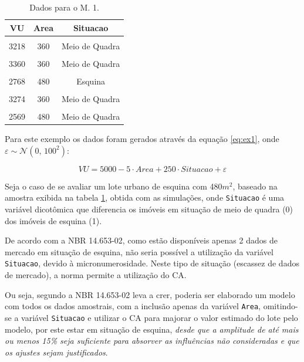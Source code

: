 \documentclass[
  a4paper, 11pt]{article}
\begin{document}
\begin{table}[ht]
\centering
\begin{tabular}{ccc}
  \hline
VU & Area & Situacao \\ 
  \hline
\cellcolor{gray!6}{3137} & \cellcolor{gray!6}{360} & \cellcolor{gray!6}{Meio de Quadra }\\ 
  3218 & 360 & Meio de Quadra \\ 
\cellcolor{gray!6}{  3116} & \cellcolor{gray!6}{360} & \cellcolor{gray!6}{Meio de Quadra }\\ 
  3360 & 360 & Meio de Quadra \\ 
\cellcolor{gray!6}{  2883} & \cellcolor{gray!6}{480} & \cellcolor{gray!6}{Esquina }\\ 
  2768 & 480 & Esquina \\ 
\cellcolor{gray!6}{  3249} & \cellcolor{gray!6}{360} & \cellcolor{gray!6}{Meio de Quadra }\\ 
  3274 & 360 & Meio de Quadra \\ 
\cellcolor{gray!6}{  2658} & \cellcolor{gray!6}{480} & \cellcolor{gray!6}{Meio de Quadra }\\ 
  2569 & 480 & Meio de Quadra \\ 
   \hline
\end{tabular}
\caption{Dados para o M. 1.} 
\label{tab:ex1}
\end{table}

Para este exemplo os dados foram gerados através da equação
\ref{eq:ex1}, onde \(\varepsilon \sim \mathcal{N}(0, \,100^2)\):

\begin{equation} \label{eq:ex1}
VU = 5000 - 5 \cdot Area + 250 \cdot Situacao + \varepsilon
\end{equation}

Seja o caso de se avaliar um lote urbano de esquina com 480\(m^2\),
baseado na amostra exibida na tabela \ref{tab:ex1}, obtida com as
simulações, onde \texttt{Situacao} é uma variável dicotômica que
diferencia os imóveis em situação de meio de quadra (0) dos imóveis de
esquina (1).

De acordo com a NBR 14.653-02, como estão disponíveis apenas 2 dados de
mercado em situação de esquina, não seria possível a utilização da
variável \texttt{Situacao}, devido à micronumerosidade. Neste tipo de
situação (escassez de dados de mercado), a norma permite a utilização do
CA.

Ou seja, segundo a NBR 14.653-02 leva a crer, poderia ser elaborado um
modelo com todos os dados amostrais, com a inclusão apenas da variável
\texttt{Area}, omitindo-se a variável \texttt{Situacao} e utilizar o CA
para majorar o valor estimado do lote pelo modelo, por este estar em
situação de esquina, \emph{desde que a amplitude de até mais ou menos
15\% seja suficiente para absorver as influências não consideradas e que
os ajustes sejam justificados}.
\end{document}
